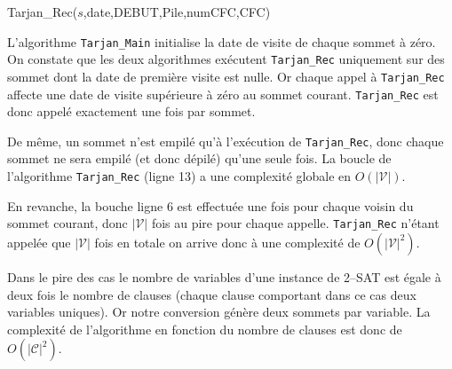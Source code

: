 \begin{enumerate}[(a)]
\begin{algorithm}[H]
  \caption{Tarjan\_Rec($s$,date,DEBUT,Pile,numCFC,CFC)}
\end{algorithm}

L'algorithme \texttt{Tarjan\_Main} initialise la date de visite de chaque sommet à zéro. On constate que les deux algorithmes exécutent \texttt{Tarjan\_Rec} uniquement sur des sommet dont la date de première visite est nulle. Or chaque appel à \texttt{Tarjan\_Rec} affecte une date de visite supérieure à zéro au sommet courant. \texttt{Tarjan\_Rec} est donc appelé exactement une fois par sommet.

De même, un sommet n'est empilé qu'à l'exécution de \texttt{Tarjan\_Rec}, donc chaque sommet ne sera empilé (et donc dépilé) qu'une seule fois. La boucle de l'algorithme \texttt{Tarjan\_Rec} (ligne 13) a une complexité globale en $O(|\mathcal{V}|)$.

En revanche, la bouche ligne 6 est effectuée une fois pour chaque voisin du sommet courant, donc $|\mathcal{V}|$ fois au pire pour chaque appelle. \texttt{Tarjan\_Rec} n'étant appelée que $|\mathcal{V}|$ fois en totale on arrive donc à une complexité de $O(|\mathcal{V}|^2)$.

Dans le pire des cas le nombre de variables d'une instance de 2--SAT est égale à deux fois le nombre de clauses (chaque clause comportant dans ce cas deux variables uniques). Or notre conversion génère deux sommets par variable. La complexité de l'algorithme en fonction du nombre de clauses est donc de $O(|\mathcal{C}|^2)$.



\end{enumerate}
